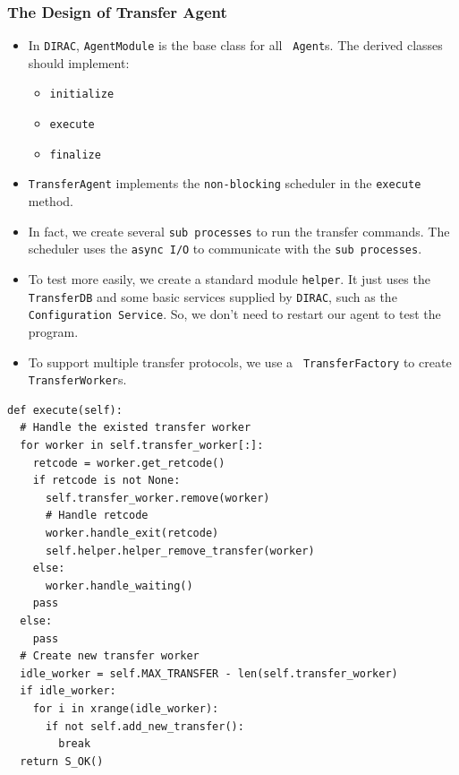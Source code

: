 \begin{frame}
    \frametitle{The Design of Transfer Agent}
    \begin{itemize}
        \item In {\tt DIRAC}, {\tt AgentModule} is the base class for all {\tt
            Agent}s. The derived classes should implement:
        \begin{itemize}
            \item {\tt initialize}
            \item {\tt execute}
            \item {\tt finalize}
        \end{itemize}
        \item {\tt TransferAgent} implements the {\tt non-blocking}
              scheduler in the {\tt execute} method.
        \item In fact, we create several {\tt sub processes} to run the 
                transfer commands. The scheduler uses the {\tt async I/O}
                to communicate with the {\tt sub processes}.
        \item To test more easily, we create a standard module {\tt helper}.
              It just uses the {\tt TransferDB} and some basic services supplied
              by {\tt DIRAC}, such as the {\tt Configuration Service}.
              So, we don't need to restart our agent to test the program.
        \item To support multiple transfer protocols, we use a {\tt
                TransferFactory} to create {\tt TransferWorker}s.
    \end{itemize}
\end{frame}

\newsavebox{\TransferAgentExecute}
\begin{lrbox}{\TransferAgentExecute}
\begin{lstlisting}
def execute(self):
  # Handle the existed transfer worker
  for worker in self.transfer_worker[:]:
    retcode = worker.get_retcode()
    if retcode is not None:
      self.transfer_worker.remove(worker)
      # Handle retcode
      worker.handle_exit(retcode)
      self.helper.helper_remove_transfer(worker)
    else:
      worker.handle_waiting()
    pass
  else:
    pass
  # Create new transfer worker
  idle_worker = self.MAX_TRANSFER - len(self.transfer_worker)
  if idle_worker:
    for i in xrange(idle_worker):
      if not self.add_new_transfer():
        break
  return S_OK()
\end{lstlisting}
\end{lrbox}

